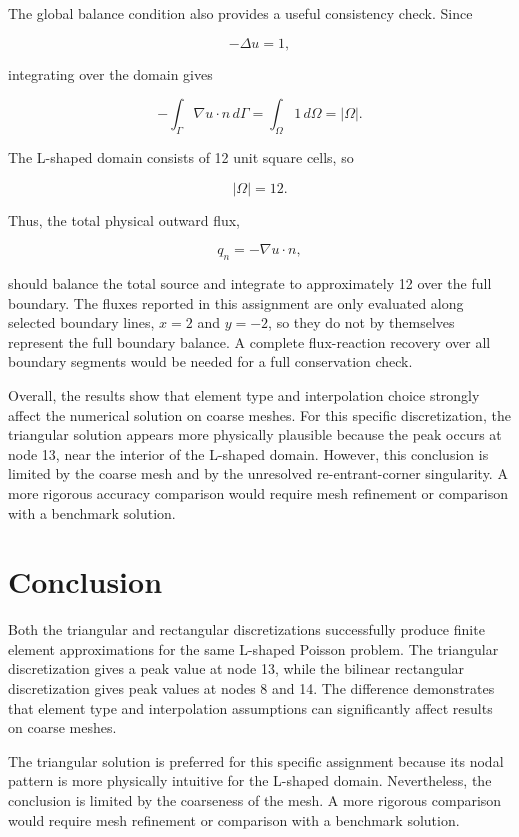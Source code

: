 \documentclass[14pt,a4paper]{article}
\begin{document}
The global balance condition also provides a useful consistency check. Since

\[
-\Delta u = 1,
\]

integrating over the domain gives

\[
-\int_{\Gamma} \nabla u \cdot n \, d\Gamma
=
\int_{\Omega} 1\,d\Omega
=
|\Omega|.
\]

The L-shaped domain consists of 12 unit square cells, so

\[
|\Omega|=12.
\]

Thus, the total physical outward flux,

\[
q_n=-\nabla u\cdot n,
\]

should balance the total source and integrate to approximately 12 over the full boundary. The fluxes reported in this assignment are only evaluated along selected boundary lines, \(x=2\) and \(y=-2\), so they do not by themselves represent the full boundary balance. A complete flux-reaction recovery over all boundary segments would be needed for a full conservation check.

Overall, the results show that element type and interpolation choice strongly affect the numerical solution on coarse meshes. For this specific discretization, the triangular solution appears more physically plausible because the peak occurs at node 13, near the interior of the L-shaped domain. However, this conclusion is limited by the coarse mesh and by the unresolved re-entrant-corner singularity. A more rigorous accuracy comparison would require mesh refinement or comparison with a benchmark solution.

\section{Conclusion}

Both the triangular and rectangular discretizations successfully produce finite element approximations for the same L-shaped Poisson problem. The triangular discretization gives a peak value at node 13, while the bilinear rectangular discretization gives peak values at nodes 8 and 14. The difference demonstrates that element type and interpolation assumptions can significantly affect results on coarse meshes.

The triangular solution is preferred for this specific assignment because its nodal pattern is more physically intuitive for the L-shaped domain. Nevertheless, the conclusion is limited by the coarseness of the mesh. A more rigorous comparison would require mesh refinement or comparison with a benchmark solution.
\end{document}
